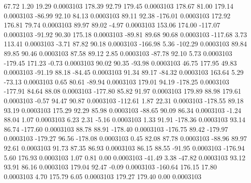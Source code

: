        67.72        1.20       19.29     0.0003103
      178.39       92.79      179.45     0.0003103
      178.67       81.00      179.14     0.0003103
      -86.99       92.10       84.13     0.0003103
       89.11       92.38     -176.01     0.0003103
      172.92      176.81       79.74     0.0003103
       89.97       89.02       -4.97     0.0003103
      153.06      174.00     -117.07     0.0003103
      -91.92       90.30      175.18     0.0003103
      -89.81       89.68       90.68     0.0003103
     -117.68        3.73      113.41     0.0003103
       -3.71       87.82       90.18     0.0003103
     -166.98        5.36     -102.29     0.0003103
       89.84       89.85       90.46     0.0003103
       87.58       89.12        2.85     0.0003103
      -87.78       92.10        5.73     0.0003103
     -179.45      171.23       -0.73     0.0003103
       90.02       90.35      -93.98     0.0003103
       46.75      177.95       49.83     0.0003103
      -91.19       88.18      -84.45     0.0003103
       91.34       89.17      -84.32     0.0003103
      163.64        5.29      -73.13     0.0003103
        0.65       80.61      -89.94     0.0003103
      179.01       94.19     -178.25     0.0003103
     -177.91       84.64       88.08     0.0003103
     -177.80       85.82       91.97     0.0003103
      179.89       88.98      179.61     0.0003103
       -0.57       94.47       90.87     0.0003103
     -112.61        1.87       22.31     0.0003103
     -178.55       89.18       93.19     0.0003103
      175.29       92.29       85.98     0.0003103
      -88.65       90.09       86.34     0.0003103
       -1.24       88.04        1.07     0.0003103
        6.23        2.31       -5.16     0.0003103
        1.33       91.91     -178.36     0.0003103
       93.14       86.74     -177.60     0.0003103
       88.78       88.91     -178.40     0.0003103
     -176.75       89.42     -179.97     0.0003103
     -179.27       96.56     -178.08     0.0003103
        0.45       82.08       87.78     0.0003103
      -88.96       89.97       92.61     0.0003103
       91.73       87.35       86.93     0.0003103
       86.15       88.55      -91.95     0.0003103
     -176.94        5.60      176.93     0.0003103
        1.07        0.81        0.00     0.0003103
      -41.49        3.38      -47.82     0.0003103
       93.12       93.91       86.16     0.0003103
      179.04       92.47       -0.09     0.0003103
     -160.64      176.15       17.80     0.0003103
        4.70      175.79        6.05     0.0003103
      179.27      179.40        0.00     0.0003103
